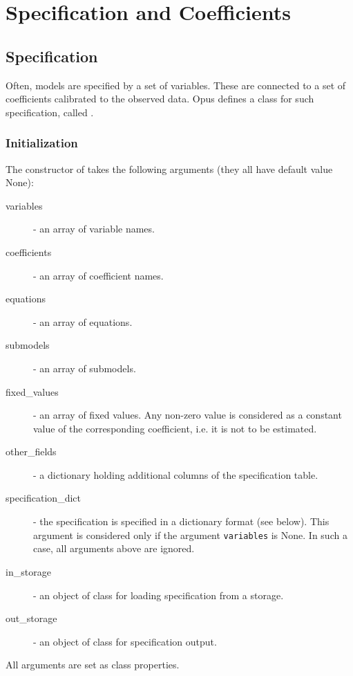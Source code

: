 \section{Specification and Coefficients}
\label{sec:specification-coefficients}
%
\subsection{Specification}
%
\label{sec:specification}
Often, models are specified by a set of variables. These are connected to a
set of coefficients calibrated to the observed data. Opus defines a class for
such specification, called .

\subsubsection{Initialization}
The constructor of 
takes the following arguments (they all have default value None):
\begin{description}
\item[variables] - an array of variable names.
\item[coefficients] - an array  of coefficient names.
\item[equations] - an array of equations.
\item[submodels] - an array of submodels.
\item[fixed_values] - an array of fixed values. Any non-zero value is considered as a constant value
  of the corresponding coefficient, i.e. it is not to be estimated.
\item[other_fields] - a dictionary holding additional columns of the specification table.
\item[specification_dict] - the specification is specified in a dictionary format (see below). This argument 
 is considered only if the argument
  \verb|variables| is None. In such a case, all arguments above are ignored.
\item[in_storage] - an object of class  for loading
  specification from a storage.
\item[out_storage] - an object of class  for specification output.
\end{description}

All arguments are set as class properties.

